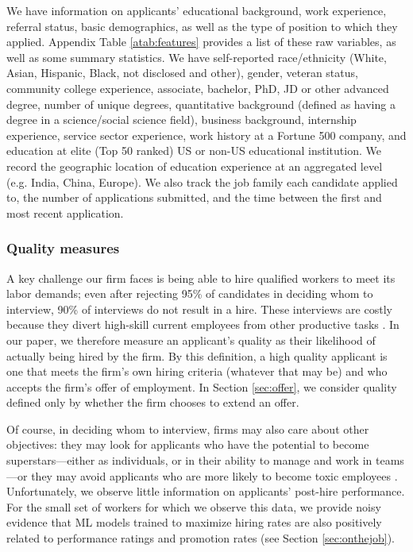 \documentclass[crop,noquery,editorname,historyrev,nosurname,runningno,sepcount]{RESTUD}
\begin{document}
We have information on applicants' educational background, work experience, referral status, basic demographics, as well as the type of position to which they applied.  Appendix Table \ref{atab:features} provides a list of these raw variables, as well as some summary statistics.  We have self-reported race/ethnicity (White, Asian, Hispanic, Black, not disclosed and other), gender, veteran status, community college experience, associate, bachelor, PhD, JD or other advanced degree, number of unique degrees, quantitative background (defined as having a degree in a science/social science field), business background, internship experience, service sector experience, work history at a Fortune 500 company, and education at elite (Top 50 ranked) US or non-US educational institution. We record the geographic location of education experience at an aggregated level (e.g. India, China, Europe). We also track the job family each candidate applied to, the number of applications submitted, and the time between the first and most recent application. 

\subsubsection{Quality measures}

A key challenge our firm faces is being able to hire qualified workers to meet its labor demands; even after rejecting 95\% of candidates in deciding whom to interview, 90\% of interviews do not result in a hire.  These interviews are costly because they divert high-skill current employees from other productive tasks \citep{kuhn2019}.  In our paper, we therefore measure an applicant's quality as their likelihood of actually being hired by the firm.  By this definition, a high quality applicant is one that meets the firm's own hiring criteria (whatever that may be) and who accepts the firm's offer of employment.  In Section \ref{sec:offer}, we consider quality defined only by whether the firm chooses to extend an offer. 

Of course, in deciding whom to interview, firms may also care about other objectives: they may look for applicants who have the potential to become superstars---either as individuals, or in their ability to manage and work in teams---or they may avoid applicants who are more likely to become toxic employees \citep{benson2019, demingsocialskills, minortoxic, reagans2001, schumann2019making}.  Unfortunately, we observe little information on applicants' post-hire performance.  For the small set of workers for which we observe this data, we provide noisy evidence that ML models trained to maximize hiring rates are also positively related to performance ratings and promotion rates (see Section \ref{sec:onthejob}).
\end{document}
